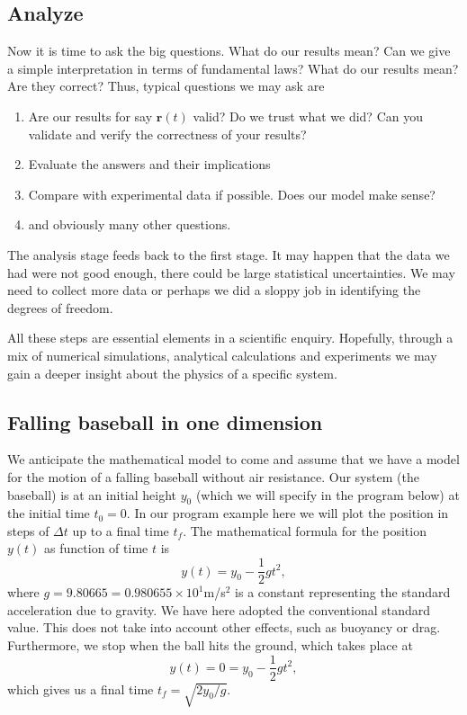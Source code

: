 \documentclass[%
oneside,                 %
final,                   %
10pt]{article}
\begin{document}
\subsection*{Analyze}

Now it is time to ask the big questions. What do our results mean? Can we give a simple interpretation in terms of fundamental laws?  What do our results mean? Are they correct?
Thus, typical questions we may ask are
\begin{enumerate}
\item Are our results for say $\bm{r}(t)$ valid?  Do we trust what we did?  Can you validate and verify the correctness of your results?

\item Evaluate the answers and their implications

\item Compare with experimental data if possible. Does our model make sense?

\item and obviously many other questions.
\end{enumerate}

\noindent
The analysis stage feeds back to the first stage. It may happen that
the data we had were not good enough, there could be large statistical
uncertainties. We may need to collect more data or perhaps we did a
sloppy job in identifying the degrees of freedom.

All these steps are essential elements in a scientific
enquiry. Hopefully, through a mix of numerical simulations, analytical
calculations and experiments we may gain a deeper insight about the
physics of a specific system.

\subsection*{Falling baseball in one dimension}

We anticipate the mathematical model to come and assume that we have a
model for the motion of a falling baseball without air resistance.
Our system (the baseball) is at an initial height $y_0$ (which we will
specify in the program below) at the initial time $t_0=0$. In our program example here we will plot the position in steps of $\Delta t$ up to a final time $t_f$. 
The mathematical formula for the position $y(t)$ as function of time $t$ is 
\[
y(t) = y_0-\frac{1}{2}gt^2,
\]
where $g=9.80665=0.980655\times 10^1$m/s${}^2$ is a constant representing the standard acceleration due to gravity.
We have here adopted the conventional standard value. This does not take into account other effects, such as buoyancy or drag.
Furthermore, we stop when the ball hits the ground, which takes place at
\[
y(t) = 0= y_0-\frac{1}{2}gt^2,
\]
which gives us a final time $t_f=\sqrt{2y_0/g}$. 
\end{document}

